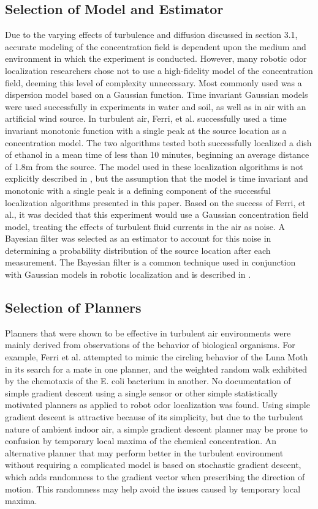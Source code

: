 \documentclass[submit]{aiaa-pretty-modified}
\begin{document}
\subsection{Selection of Model and Estimator}
Due to the varying effects of turbulence and diffusion discussed in section 3.1,
accurate modeling of the concentration field is dependent upon the medium and
environment in which the experiment is conducted. However, many robotic odor
localization researchers chose not to use a high-fidelity model of the
concentration field, deeming this level of complexity unnecessary. \cite{kowadlo} Most
commonly used was a dispersion model based on a Gaussian function. Time
invariant Gaussian models were used successfully in experiments in water and
soil, as well as in air with an artificial wind source. \cite{kowadlo} In turbulent air,
Ferri, et al. successfully used a time invariant monotonic function with a
single peak at the source location as a concentration model. \cite{ferri} The two
algorithms tested both successfully localized a dish of ethanol in a mean time
of less than 10 minutes, beginning an average distance of 1.8m from the source.
The model used in these localization algorithms is not explicitly described in
\cite{ferri}, but the assumption that the model is time invariant and monotonic with a
single peak is a defining component of the successful localization algorithms
presented in this paper. Based on the success of Ferri, et al., it was decided
that this experiment would use a Gaussian concentration field model, treating
the effects of turbulent fluid currents in the air as noise. A Bayesian filter
was selected as an estimator to account for this noise in determining a
probability distribution of the source location after each measurement. The
Bayesian filter is a common technique used in conjunction with Gaussian models
in robotic localization and is described in \cite{bergman}.

\subsection{Selection of Planners}
Planners that were shown to be effective in turbulent air environments were
mainly derived from observations of the behavior of biological organisms.
\cite{ferri} For example, Ferri et al. attempted to mimic the circling behavior
of the Luna Moth in its search for a mate in one planner, and the weighted
random walk exhibited by the chemotaxis of the E. coli bacterium in another.
\cite{ferri} No documentation of simple gradient descent using a single sensor
or other simple statistically motivated planners as applied to robot odor
localization was found. Using simple gradient descent is attractive because of
its simplicity, but due to the turbulent nature of ambient indoor air, a simple
gradient descent planner may be prone to confusion by temporary local maxima of
the chemical concentration. An alternative planner that may perform better in
the turbulent environment without requiring a complicated model is based on
stochastic gradient descent, which adds randomness to the gradient vector when
prescribing the direction of motion. \cite{bottou} This randomness may
help avoid
the issues caused by temporary local maxima.
\end{document}

